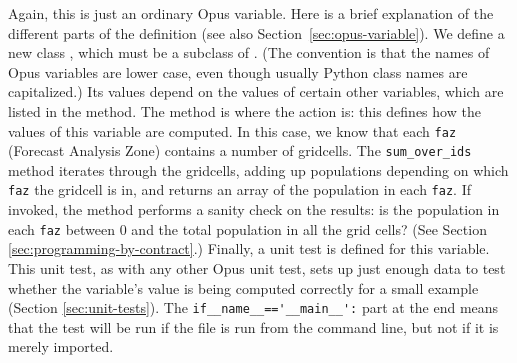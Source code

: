 Again, this is just an ordinary Opus variable. \variablesindex Here
is a brief explanation of the different parts of the definition (see
also Section~\ref{sec:opus-variable}).  We define a new class
, which must be a subclass of .
\variablesindex (The convention is that the names of Opus variables
\variablesindex are lower case, even though usually Python
\pythonindex class names are capitalized.)  Its values depend on the
values of certain other variables, \variablesindex which are listed
in the  method.  The  method is
where the action is: this defines how the values of this variable
\variablesindex are computed.  In this case, we know that each
\verb|faz| (Forecast Analysis Zone) contains a number of gridcells. 
The \verb|sum_over_ids| method iterates through
the gridcells, adding up populations depending on which
\verb|faz| the gridcell is in, and returns an array of
the population in each \verb|faz|.  If invoked, the
 method performs a sanity check on the results:
is the population in each \verb|faz| between 0 and the total
population in all the grid cells?  (See Section
\ref{sec:programming-by-contract}.)  Finally, a unit test is defined
for this variable. \variablesindex This unit test, as with any other
Opus unit test, sets up just enough data to test whether the
variable's \variablesindex value is being computed correctly for a
small example (Section \ref{sec:unit-tests}). The
\verb|if__name__=='__main__':| part at the end means that the test
will be run if the file is run from the command line, but not if it
is merely imported.

